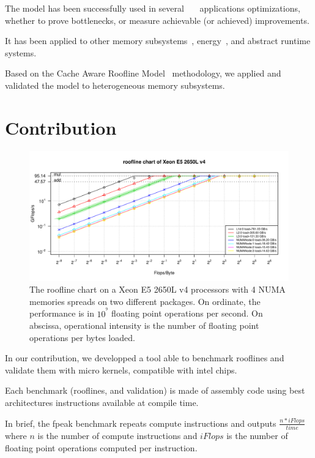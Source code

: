 \documentclass[twoside,twocolumn,8pt]{extarticle}
\begin{document}
The model has been successfully used in
several~\cite{Kim20111201}~\cite{Rossinelli2164}~\cite{vanNieuwpoort:2009:UMH:1542275.1542337} applications optimizations, whether
to prove bottlenecks, or measure achievable (or achieved) improvements.

It has been applied to other memory subsystems~\cite{ilic2014cache}, energy~\cite{7493653}, and abstract runtime systems.

Based on the Cache Aware Roofline Model~\cite{ilic2014cache} methodology, we applied and validated the model to heterogeneous
memory subsystems.

\section{Contribution}\label{sec:contrib}
\begin{figure}
  \centering
  \includegraphics[width=\textwidth]{pictures/roofline_model}
  \caption{The roofline chart on a Xeon E5 2650L v4 processors with 4 NUMA memories spreads on two different packages. On ordinate, the performance is in $10^{^9}$ floating point operations per second. On abscissa, operational intensity is the number of floating point operations per bytes loaded.}
  \label{fig:orig_model}
\end{figure}

In our contribution, we developped a tool able to benchmark rooflines and validate them with micro kernels, compatible with intel
chips.

Each benchmark (rooflines, and validation) is made of assembly code using best architectures instructions available at compile
time.

In brief, the fpeak benchmark repeats compute instructions and outputs $\frac{n*iFlops}{time}$ where $n$ is the number of compute
instructions and $iFlops$ is the number of floating point operations computed per instruction.
\end{document}
